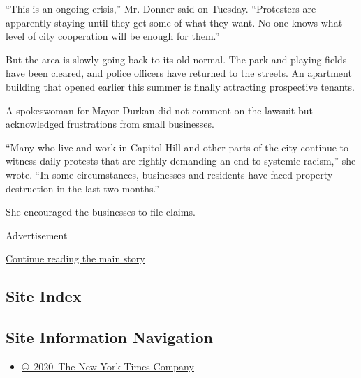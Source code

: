 ``This is an ongoing crisis,'' Mr. Donner said on Tuesday. ``Protesters
are apparently staying until they get some of what they want. No one
knows what level of city cooperation will be enough for them.''

But the area is slowly going back to its old normal. The park and
playing fields have been cleared, and police officers have returned to
the streets. An apartment building that opened earlier this summer is
finally attracting prospective tenants.

A spokeswoman for Mayor Durkan did not comment on the lawsuit but
acknowledged frustrations from small businesses.

``Many who live and work in Capitol Hill and other parts of the city
continue to witness daily protests that are rightly demanding an end to
systemic racism,'' she wrote. ``In some circumstances, businesses and
residents have faced property destruction in the last two months.''

She encouraged the businesses to file claims.

Advertisement

\protect\hyperlink{after-bottom}{Continue reading the main story}

\hypertarget{site-index}{%
\subsection{Site Index}\label{site-index}}

\hypertarget{site-information-navigation}{%
\subsection{Site Information
Navigation}\label{site-information-navigation}}

\begin{itemize}
\tightlist
\item
  \href{https://help.nytimes.com/hc/en-us/articles/115014792127-Copyright-notice}{©~2020~The
  New York Times Company}
\end{itemize}

